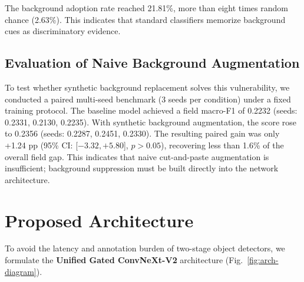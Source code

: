 \documentclass[conference]{IEEEtran}
\begin{document}
The background adoption rate reached 21.81\%, more than eight times random chance (2.63\%). This indicates that standard classifiers memorize background cues as discriminatory evidence.

\subsection{Evaluation of Naive Background Augmentation}
To test whether synthetic background replacement solves this vulnerability, we conducted a paired multi-seed benchmark (3 seeds per condition) under a fixed training protocol. The baseline model achieved a field macro-F1 of 0.2232 (seeds: 0.2331, 0.2130, 0.2235). With synthetic background augmentation, the score rose to 0.2356 (seeds: 0.2287, 0.2451, 0.2330). The resulting paired gain was only +1.24 pp (95\% CI: [$-3.32, +5.80$], $p > 0.05$), recovering less than 1.6\% of the overall field gap. This indicates that naive cut-and-paste augmentation is insufficient; background suppression must be built directly into the network architecture.

\section{Proposed Architecture}
To avoid the latency and annotation burden of two-stage object detectors, we formulate the \textbf{Unified Gated ConvNeXt-V2} architecture (Fig.~\ref{fig:arch-diagram}).
\end{document}
